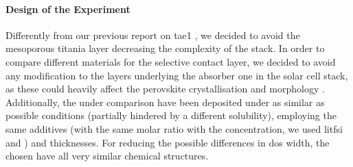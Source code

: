 	\begin{figure}
	\end{figure}

	\paragraph{Design of the Experiment}
	Differently from our previous report on \gls{tae1} \cite{Cabau2015a}, we decided to avoid the mesoporous titania layer decreasing the complexity of the stack.
	In order to compare different materials for the selective contact layer, we decided to avoid any modification to the layers underlying the absorber one in the solar cell stack, as these could heavily affect the perovskite crystallisation and morphology \cite{Tao2017,Bi2015}.
	Additionally, the  under comparison have been deposited under as similar as possible conditions (partially hindered by a different solubility), employing the same additives (with the same molar ratio with the  concentration, we used \gls{litfsi} and ) and thicknesses.
	For reducing the possible differences in \gls{dos} width, the chosen  have all very similar chemical structures.


